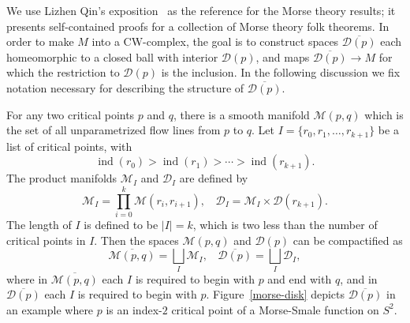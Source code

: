 \documentclass[psamsfonts]{amsart}
\theoremstyle{remark}
\newcommand{\abs}[1]{\left\lvert #1 \right\rvert}
\DeclareMathOperator{\ind}{ind}
\begin{document}
We use Lizhen Qin's exposition~\cite{Qin10} as the reference for the Morse theory results; it presents self-contained proofs for a collection of Morse theory folk theorems.  In order to make $M$ into a CW-complex, the goal is to construct spaces $\overline{\mathcal{D}(p)}$ each homeomorphic to a closed ball with interior $\mathcal{D}(p)$, and maps $\overline{\mathcal{D}(p)} \rightarrow M$ for which the restriction to $\mathcal{D}(p)$ is the inclusion.  In the following discussion we fix notation necessary for describing the structure of $\overline{\mathcal{D}(p)}$.

For any two critical points $p$ and $q$, there is a smooth manifold $\mathcal{M}(p, q)$ which is the set of all unparametrized flow lines from $p$ to $q$.  Let $I = \{r_0, r_1, \ldots, r_{k+1}\}$ be a list of critical points, with 
\[\ind(r_0) > \ind(r_1) > \cdots > \ind(r_{k+1}).\]
The product manifolds $\mathcal{M}_I$ and $\mathcal{D}_I$ are defined by
\[\mathcal{M}_I = \prod_{i = 0}^k \mathcal{M}(r_i, r_{i+1}),\ \ \ \ \mathcal{D}_I = \mathcal{M}_I \times \mathcal{D}(r_{k+1}).\]
The length of $I$ is defined to be $\abs{I} = k$, which is two less than the number of critical points in $I$.  Then the spaces $\mathcal{M}(p, q)$ and $\mathcal{D}(p)$ can be compactified as
\[\overline{\mathcal{M}(p, q)} = \bigsqcup_{I} \mathcal{M}_I,\ \ \ \ \overline{\mathcal{D}(p)} = \bigsqcup_I \mathcal{D}_I,\]
where in $\overline{\mathcal{M}(p, q)}$ each $I$ is required to begin with $p$ and end with $q$, and in $\overline{\mathcal{D}(p)}$ each $I$ is required to begin with $p$.  Figure~\ref{morse-disk} depicts $\overline{\mathcal{D}(p)}$ in an example where $p$ is an index-$2$ critical point of a Morse-Smale function on $S^2$.
\end{document}
